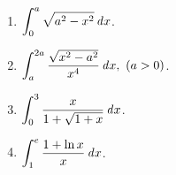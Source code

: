 \documentclass[a4paper,punct=CCT]{ctexbook}
\theoremstyle{definition}
\theoremstyle{remark}
\newif\ifshowsol
\begin{document}
\begin{enumerate}
\item \(\displaystyle \int_0^a \sqrt{a^2 - x^2} \mathop{}\!\mathit{d} x\).

  \ifshowsol
  根据被积函数的几何意义, 有
  \[
    \int_0^a \sqrt{a^2 - x^2} \dx = \frac{\pi a^2}{4}.
  \]
  \fi

\item \(\displaystyle \int_a^{2a} \frac{\sqrt{x^2 - a^2}}{x^4} \mathop{}\!\mathit{d} x, \ (a > 0)\).

  \ifshowsol
  用\(x = a \sec t\)做换元, 有
  \[
    \begin{split}
      \int_a^{2a} \frac{\sqrt{x^2 - a^2}}{x^4} \dx
      &= \int_0^{\pi/3} \frac{\sqrt{a^2 \sec^2 t - a^2} \cdot a \tan t \sec t}{a^4 \sec^4 t} \dt
      = \frac{1}{a^2} \int_0^{\pi/3} \frac{\tan^2 t}{\sec^3 t} \dt \\
      &= \frac{1}{a^2} \int_0^{\pi/3} \sin^2 t \cos t \dt
      = \frac{1}{a^2} \int_0^{\sqrt3/2} u^2 \du \\
      &= \frac{1}{a^2} \frac{u^3}{3}\bigg\vert_0^{\sqrt3/2}
      = \frac{\sqrt3}{8a^2}.
    \end{split}
  \]
  也可以用\(x = a \cosh t\)做换元, 有
  \[
    \begin{split}
      \int_a^{2a} \frac{\sqrt{x^2 - a^2}}{x^4} \dx
      &= \int_0^{\arccosh2} \frac{\sqrt{a^2 \cosh^2 t - a^2} \cdot a \sinh t}{a^4 \cosh^4 t} \dt
      = \frac1{a^2} \int_0^{\arccosh2} \tanh^2 t \sech^2 t \dt \\
      &= \frac1{a^2} \int_0^{\tanh\arccosh2} u^2 \du
      = \frac1{a^2} \frac{u^3}{3} \bigg\vert_0^{\sqrt3/2}
      = \frac{\sqrt3}{8a^2}.
    \end{split}
  \]
  其中
  \[
    \tanh\arccosh2 = \tanh\arcsech\frac12 = \sqrt{1 - \sech^2\arcsech\frac12}
    = \sqrt{1 - \frac14} = \frac{\sqrt3}{2}.
  \]
  \fi

\item \(\displaystyle \int_0^3 \frac{x}{1 + \sqrt{1+x}} \mathop{}\!\mathit{d} x\).

  \ifshowsol
  用\(t = \sqrt{1+x}\)做换元, 有
  \[
    \int_0^3 \frac{x}{1 + \sqrt{1+x}} \dx
    = \int_1^2 \frac{t^2-1}{1+t} \cdot 2t \dt
    = 2 \int_1^2 \paren{t^2 - t} \dt
    = \frac{2}{3} t^3 \bigg\vert_1^2 - t^2 \bigg\vert_1^2
    = \frac53.
  \]
  \fi

\item \(\displaystyle \int_1^e \frac{1 + \ln x}{x} \mathop{}\!\mathit{d} x\).

  \ifshowsol
  \[
    \int_1^e \frac{1 + \ln x}{x} \dx
    = \int_1^e \frac{\dx}{x} + \int_1^e \frac{\ln x}{x} \dx
    = \ln x \bigg\vert_1^e + \frac{\ln^2 x}{2} \bigg\vert_1^e
    = 1 + \frac12 = \frac32.
  \]
  \fi


\end{enumerate}
\end{document}
